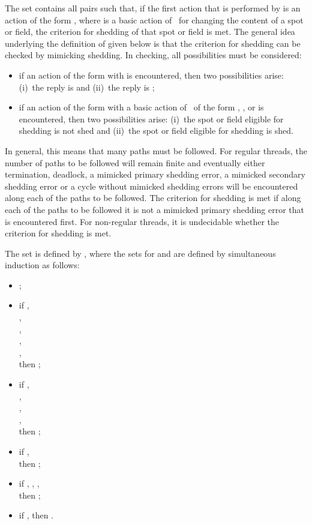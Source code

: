 \documentclass[fleqn]{llncs}
\begin{document}
The set  contains all pairs  such
that, if the first action that is performed by  is an action of the
form , where  is a basic action of \DLD\ for changing the
content of a spot or field, the criterion for shedding of that spot or
field is met.
The general idea underlying the definition of  given below is
that the criterion for shedding can be checked by mimicking shedding.
In checking, all possibilities must be considered:
\begin{itemize}
\item
if an action of the form  with  is encountered, then
two possibilities arise: (i)~the reply is  and (ii)~the reply is
;
\item
if an action of the form  with  a basic action of \DLD\ of
the form , ,  or
 is encountered, then two possibilities arise:
(i)~the spot or field eligible for shedding is not shed and (ii)~the
spot or field eligible for shedding is shed.
\end{itemize}
In general, this means that many paths must be followed.
For regular threads, the number of paths to be followed will remain
finite and eventually either termination, deadlock, a mimicked primary
shedding error, a mimicked secondary shedding error or a cycle without
mimicked shedding errors will be encountered along each of the paths to
be followed.
The criterion for shedding is met if along each of the paths to be
followed it is not a mimicked primary shedding error that is encountered
first.
For non-regular threads, it is undecidable whether the criterion for
shedding is met.

The set  is defined by , where the
sets  for  and
 are defined by simultaneous induction as
follows:
\begin{itemize}
\item
;
\item
if ,
\\ \phantom{if}
,
\\ \phantom{if}
,
\\ \phantom{if}
,
\\ \phantom{if}
,
\\
then ;
\item
if ,
\\ \phantom{if}
,
\\ \phantom{if}
,
\\ \phantom{if}
,
\\
then ;
\item
if ,
\\
then ;
\item
if , ,
,
\\
then ;
\item
if , then .
\end{itemize}
\end{document}
